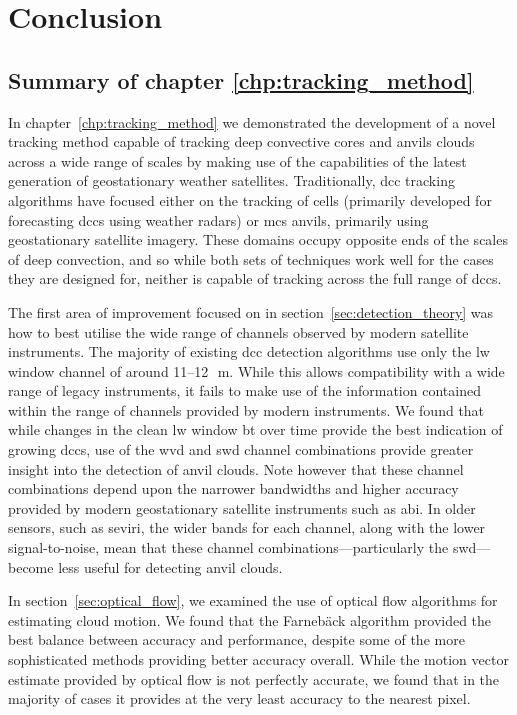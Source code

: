 \chapter{Conclusion} \label{chp:conclusion}

\section{Summary of chapter \ref{chp:tracking_method}}

In chapter~\ref{chp:tracking_method} we demonstrated the development of a novel tracking method capable of tracking deep convective cores and anvils clouds across a wide range of scales by making use of the capabilities of the latest generation of geostationary weather satellites.
Traditionally, \acrshort{dcc} tracking algorithms have focused either on the tracking of cells (primarily developed for forecasting \acrshort{dcc}s using weather radars) or \acrshort{mcs} anvils, primarily using geostationary satellite imagery.
These domains occupy opposite ends of the scales of deep convection, and so while both sets of techniques work well for the cases they are designed for, neither is capable of tracking across the full range of \acrshort{dcc}s.

The first area of improvement focused on in section~\ref{sec:detection_theory} was how to best utilise the wide range of channels observed by modern satellite instruments.
The majority of existing \acrshort{dcc} detection algorithms use only the \acrshort{lw} window channel of around 11--12\,\unit{\mu m}.
While this allows compatibility with a wide range of legacy instruments, it fails to make use of the information contained within the range of channels provided by modern instruments.
We found that while changes in the clean \acrshort{lw} window \acrshort{bt} over time provide the best indication of growing \acrshort{dcc}s, use of the \acrshort{wvd} and \acrshort{swd} channel combinations provide greater insight into the detection of anvil clouds.
Note however that these channel combinations depend upon the narrower bandwidths and higher accuracy provided by modern geostationary satellite instruments such as \acrshort{abi}.
In older sensors, such as \acrshort{seviri}, the wider bands for each channel, along with the lower signal-to-noise, mean that these channel combinations---particularly the \acrshort{swd}---become less useful for detecting anvil clouds.

In section~\ref{sec:optical_flow}, we examined the use of optical flow algorithms for estimating cloud motion.
We found that the Farnebäck algorithm provided the best balance between accuracy and performance, despite some of the more sophisticated methods providing better accuracy overall.
While the motion vector estimate provided by optical flow is not perfectly accurate, we found that in the majority of cases it provides at the very least accuracy to the nearest pixel.

